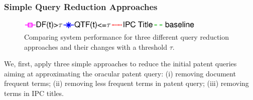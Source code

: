 \subsubsection{Simple Query Reduction Approaches}
\begin{figure}[t!]
\begin{centering}
\includegraphics[width=9cm]{figs/l3}
\par\end{centering}

\begin{centering}
 \hspace*{1.5cm}  
\par\end{centering} 

\protect\caption{Comparing system performance for three different query reduction approaches and their changes with a threshold $\tau$.}
\label{fig:combinedapproach}
\end{figure}
\label{SimpleApproaches}
We, first, apply three simple approaches to reduce the initial patent queries aiming at approximating the oracular patent query: (i) removing document frequent terms; (ii) removing less frequent terms in patent query; (iii) removing terms in IPC titles.
